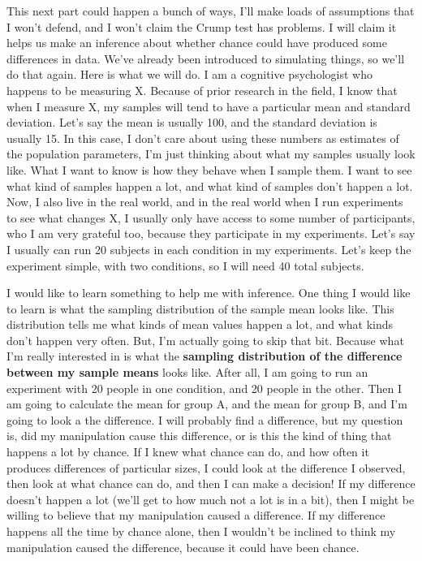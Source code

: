 \documentclass[]{book}
\begin{document}
This next part could happen a bunch of ways, I'll make loads of assumptions that I won't defend, and I won't claim the Crump test has problems. I will claim it helps us make an inference about whether chance could have produced some differences in data. We've already been introduced to simulating things, so we'll do that again. Here is what we will do. I am a cognitive psychologist who happens to be measuring X. Because of prior research in the field, I know that when I measure X, my samples will tend to have a particular mean and standard deviation. Let's say the mean is usually 100, and the standard deviation is usually 15. In this case, I don't care about using these numbers as estimates of the population parameters, I'm just thinking about what my samples usually look like. What I want to know is how they behave when I sample them. I want to see what kind of samples happen a lot, and what kind of samples don't happen a lot. Now, I also live in the real world, and in the real world when I run experiments to see what changes X, I usually only have access to some number of participants, who I am very grateful too, because they participate in my experiments. Let's say I usually can run 20 subjects in each condition in my experiments. Let's keep the experiment simple, with two conditions, so I will need 40 total subjects.

I would like to learn something to help me with inference. One thing I would like to learn is what the sampling distribution of the sample mean looks like. This distribution tells me what kinds of mean values happen a lot, and what kinds don't happen very often. But, I'm actually going to skip that bit. Because what I'm really interested in is what the \textbf{sampling distribution of the difference between my sample means} looks like. After all, I am going to run an experiment with 20 people in one condition, and 20 people in the other. Then I am going to calculate the mean for group A, and the mean for group B, and I'm going to look a the difference. I will probably find a difference, but my question is, did my manipulation cause this difference, or is this the kind of thing that happens a lot by chance. If I knew what chance can do, and how often it produces differences of particular sizes, I could look at the difference I observed, then look at what chance can do, and then I can make a decision! If my difference doesn't happen a lot (we'll get to how much not a lot is in a bit), then I might be willing to believe that my manipulation caused a difference. If my difference happens all the time by chance alone, then I wouldn't be inclined to think my manipulation caused the difference, because it could have been chance.
\end{document}
